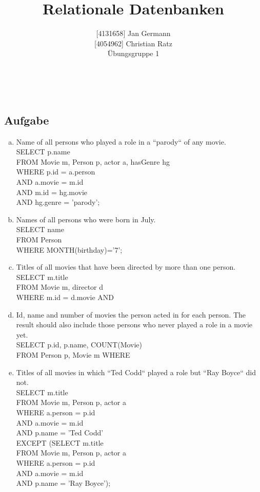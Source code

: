 \documentclass[11pt,a4paper,DIV=9]{scrartcl}
\author{{[}4131658{]} Jan Germann \\{[}4054962{]} Christian Ratz\\Übungsgruppe 1}
\title{Relationale Datenbanken}
\newcounter{temp}
\newcommand{\aufgabe}[1]{
  \setcounter{temp}{\value{subsection}}
  \setcounter{subsection}{#1}
  \addtocounter{subsection}{-1}
  \subsection{Aufgabe}
  \setcounter{subsection}{\value{temp}}
}
\renewcommand{\author}[1]{\renewcommand{\author}{#1}}
\renewcommand{\title}[1]{\renewcommand{\title}{#1}}
\newcommand{\makehomeworktitle}{
  \begin{minipage}[t]{6.5cm}
    \sf{\author}
  \end{minipage}
  \begin{minipage}[t]{6.5cm}
    \begin{flushright}
      \sf{\title\\\today}
    \end{flushright}
  \end{minipage}
  \\[0.2cm]
  \begin{center}
    \sf{
      \color{blue}{
        \LARGE{Aufgabenblatt \blattnr}
      }
    }
  \end{center}
  \vspace{0.1cm}
}
\begin{document}
\makehomeworktitle
\aufgabe{1}
  \begin{enumerate}[a.]
    	\item Name of all persons who played a role in a ``parody`` of any movie.\hfill\\
	SELECT p.name \\
	FROM Movie m, Person p, actor a, hasGenre hg \\
	WHERE p.id = a.person \\
	AND a.movie = m.id \\
	AND m.id = hg.movie \\
 	AND hg.genre = 'parody';

       	\item Names of all persons who were born in July.\hfill\\
	SELECT name \\
	FROM Person \\
	WHERE MONTH(birthday)='7';
	
           \item Titles of all movies that have been directed by more than one person.\hfill\\ %
           SELECT m.title \\
           FROM Movie m, director d \\
           WHERE m.id = d.movie
           AND 

           \item Id, name and number of movies the person acted in for each person. The result should also include those persons who never played a role in a movie yet.\hfill\\ %
           SELECT p.id, p.name, COUNT(Movie) \\
           FROM Person p, Movie m
           WHERE

           \item Titles of all movies in which ``Ted Codd`` played a role but ``Ray Boyce`` did not.\hfill\\
           SELECT m.title \\
           FROM Movie m, Person p, actor a \\ 
           WHERE a.person = p.id \\
           AND a.movie = m.id \\
           AND p.name = 'Ted Codd' \\
           EXCEPT (SELECT m.title \\
           FROM Movie m, Person p, actor a \\
           WHERE a.person = p.id \\
           AND a.movie = m.id \\
           AND p.name = 'Ray Boyce');


\end{enumerate}
\end{document}
